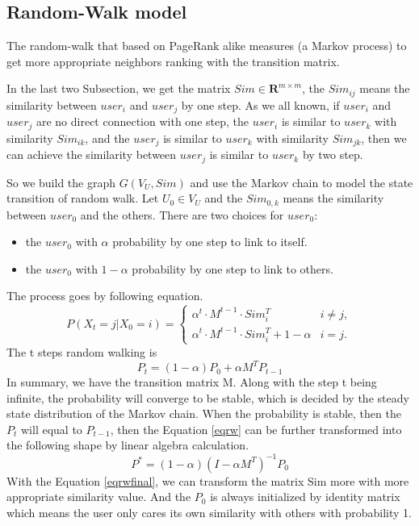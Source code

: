 \documentclass[conference]{IEEEtran}
\begin{document}
\subsection{Random-Walk model}
\par The random-walk that based on PageRank alike measures (a Markov process) to get more appropriate neighbors ranking with the transition matrix.
\par In the last two Subsection, we get the matrix $Sim \in \textbf{R}^{m \times m}$, the $Sim_{ij}$ means the similarity between $user_{i}$ and $user_{j}$ by one step. As we all known, if $user_{i}$ and $user_{j}$ are no direct connection with one step,
the $user_{i}$ is similar to $user_{k}$ with similarity $Sim_{ik}$, and the $user_{j}$ is similar to $user_{k}$ with similarity $Sim_{jk}$, then we can achieve the similarity between  $user_{j}$ is similar to $user_{k}$ by two step. 
\par So we build the graph $G(V_{U},Sim)$ and use the Markov chain to model the state transition of random walk. Let $U_{0} \in V_{U}$ and the $Sim_{0,k}$ means the similarity between $user_{0}$ and the others. There are two choices for $user_{0}$:
\begin{itemize}
\item the $user_{0}$ with $\alpha$ probability by one step to link to itself.
\item the $user_{0}$ with $1- \alpha$ probability by one step to link to others.
\end{itemize}

The process goes by following equation.
\begin{equation}
P(X_{t}=j|X_{0}=i)=\left\{\begin{array}{ll}
\alpha ^{t} \cdot M^{t-1} \cdot Sim_{i}^{T}&i \neq j,\\
\alpha ^{t} \cdot M^{t-1} \cdot Sim_{i}^{T} + 1-\alpha &i = j.
\end{array}\right.
\end{equation}
The t steps random walking is 
\begin{equation}
P_{t}=(1-\alpha)P_{0}+ \alpha M^{T}P_{t-1} 
\label{eqrw}
\end{equation}
In summary, we have the transition matrix M. Along with the step t being infinite, the probability will converge to be stable, which is decided by the steady state distribution of the Markov chain. When the probability is stable, then the $P_{t}$ will equal to $P_{t-1}$, then the Equation \ref{eqrw} can be further transformed into the following shape by linear algebra calculation.
\begin{equation}
P^{*}=(1-\alpha)(I-\alpha M^{T})^{-1}P_{0}
\label{eqrwfinal}
\end{equation} 
With the Equation \ref{eqrwfinal}, we can transform the matrix Sim more with more appropriate similarity value. And the $P_{0}$ is always initialized by identity matrix which means the user only cares its own similarity with others with probability 1.
\end{document}
